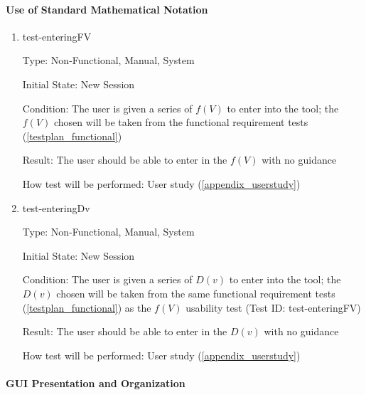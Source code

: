 \documentclass[12pt, titlepage]{article}
\begin{document}
\paragraph{Use of Standard Mathematical Notation}

\begin{enumerate}

\item{test-enteringFV}

Type: Non-Functional, Manual, System
					
Initial State: New Session
					
Condition: The user is given a series of $f(V)$ to enter into the tool; the 
$f(V)$ chosen will be taken from the functional requirement tests 
(\ref{testplan_functional})
					
Result: The user should be able to enter in the $f(V)$ with no guidance
					
How test will be performed: User study (\ref{appendix_userstudy})\\
					
\item{test-enteringDv}

Type: Non-Functional, Manual, System
					
Initial State: New Session
					
Condition: The user is given a series of $D(v)$ to enter into the tool; the 
$D(v)$ chosen will be taken from the same functional requirement tests 
(\ref{testplan_functional}) as the $f(V)$ usability test (Test ID: 
test-enteringFV)
					
Result: The user should be able to enter in the $D(v)$ with no guidance
					
How test will be performed: User study (\ref{appendix_userstudy})\\

\end{enumerate}

\paragraph{GUI Presentation and Organization}
\end{document}
